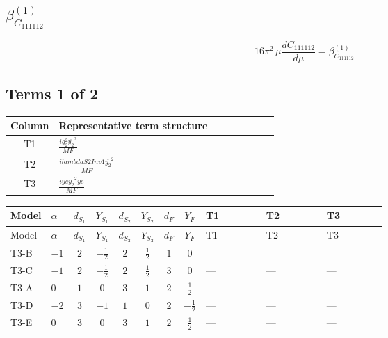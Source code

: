 \documentclass[8pt]{article}
\begin{document}
\begin{landscape}
\section*{$\beta_{C_{111112}}^{(1)}$}
\[16\pi^2\,\mu\frac{d C_{111112}}{d\mu}=\beta_{C_{111112}}^{(1)}\]
\subsection*{Terms 1 of 2}
\begin{center}
\begin{tabular}{@{}c >{\raggedright\arraybackslash}p{0.82\linewidth}@{}}
\toprule
Column & Representative term structure \\
\midrule
T1 & \(\displaystyle \frac{i g_{2}^{2} \overline{y_{2}}^{2}}{MF}\) \\
\midrule
T2 & \(\displaystyle \frac{i lambdaS2Inv1 \overline{y_{2}}^{2}}{MF}\) \\
\midrule
T3 & \(\displaystyle \frac{i ye \overline{y_{2}}^{2} \overline{ye}}{MF}\) \\
\midrule
\bottomrule
\end{tabular}
\end{center}
\smallskip
\tiny
\begin{longtable}{@{}llcccccc >{\raggedright\arraybackslash}p{0.21\linewidth} >{\raggedright\arraybackslash}p{0.21\linewidth} >{\raggedright\arraybackslash}p{0.21\linewidth}@{}}
\toprule
Model & $\alpha$ & $d_{S_1}$ & $Y_{S_1}$ & $d_{S_2}$ & $Y_{S_2}$ & $d_F$ & $Y_F$ & T1 & T2 & T3 \\
\midrule
\endfirsthead
\toprule
Model & $\alpha$ & $d_{S_1}$ & $Y_{S_1}$ & $d_{S_2}$ & $Y_{S_2}$ & $d_F$ & $Y_F$ & T1 & T2 & T3 \\
\midrule
\endhead
T3-B & $-1$ & $2$ & $-\frac{1}{2}$ & $2$ & $\frac{1}{2}$ & $1$ & $0$ & \scriptsize\adjustbox{max width=\linewidth}{$\begin{gathered} - \frac{3 i g_{2}^{2} \overline{y_{2}}^{2}}{4 MF}\end{gathered}$} & \scriptsize\adjustbox{max width=\linewidth}{$\begin{gathered} - \frac{i lambdaS2Inv1 \overline{y_{2}}^{2}}{2 MF}\end{gathered}$} & \scriptsize\adjustbox{max width=\linewidth}{$\begin{gathered} \frac{i ye \overline{y_{2}}^{2} \overline{ye}}{4 MF}\end{gathered}$} \\
\midrule
T3-C & $-1$ & $2$ & $-\frac{1}{2}$ & $2$ & $\frac{1}{2}$ & $3$ & $0$ & --- & --- & --- \\
\midrule
T3-A & $0$ & $1$ & $0$ & $3$ & $1$ & $2$ & $\frac{1}{2}$ & --- & --- & --- \\
\midrule
T3-D & $-2$ & $3$ & $-1$ & $1$ & $0$ & $2$ & $-\frac{1}{2}$ & --- & --- & --- \\
\midrule
T3-E & $0$ & $3$ & $0$ & $3$ & $1$ & $2$ & $\frac{1}{2}$ & --- & --- & --- \\
\midrule
\bottomrule
\end{longtable}
\clearpage

\end{landscape}
\end{document}
